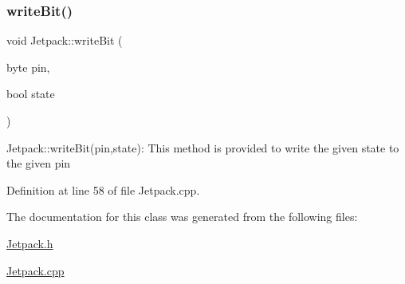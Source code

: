\subsubsection{\texorpdfstring{write\+Bit()}{writeBit()}}
{\footnotesize\ttfamily void Jetpack\+::write\+Bit (\begin{DoxyParamCaption}\item[{byte}]{pin,  }\item[{bool}]{state }\end{DoxyParamCaption})}

Jetpack\+::write\+Bit(pin,state)\+: This method is provided to write the given state to the given pin 

Definition at line 58 of file Jetpack.\+cpp.



The documentation for this class was generated from the following files\+:\begin{DoxyCompactItemize}
\item 
\hyperlink{_jetpack_8h}{Jetpack.\+h}\item 
\hyperlink{_jetpack_8cpp}{Jetpack.\+cpp}\end{DoxyCompactItemize}
